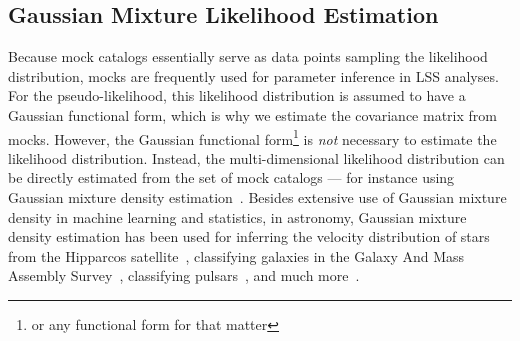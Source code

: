 \documentclass[12pt, letterpaper, preprint]{aastex}
\newcommand{\lss}{{\small{LSS}}\xspace}
\begin{document}
\subsection{Gaussian Mixture Likelihood Estimation} \label{sec:gmm}
Because mock catalogs essentially serve as data points sampling the likelihood
distribution, mocks are frequently used for parameter inference in \lss analyses.
For the pseudo-likelihood, this likelihood distribution is assumed to have a 
Gaussian functional form, which is why we estimate the covariance matrix 
from mocks. However, the Gaussian functional form\footnote{or any functional form for 
that matter} is \emph{not} necessary to estimate the likelihood distribution. 
Instead, the multi-dimensional likelihood distribution 
can be directly estimated from the set of mock catalogs --- for 
instance using Gaussian mixture density 
estimation~\citep{Press:1992:NRC:148286,9780471006268}. 
Besides extensive use of Gaussian mixture density in machine learning and statistics, 
in astronomy, Gaussian mixture density estimation has been used for 
inferring the velocity distribution of stars from the Hipparcos 
satellite~\citep{bovy2011}, classifying galaxies in the Galaxy And Mass Assembly 
Survey~\citep{taylor2015}, classifying pulsars~\citep{lee2012}, and much more~\citep[see also][]{hogg2010,kuhn2017}. 
\end{document}
